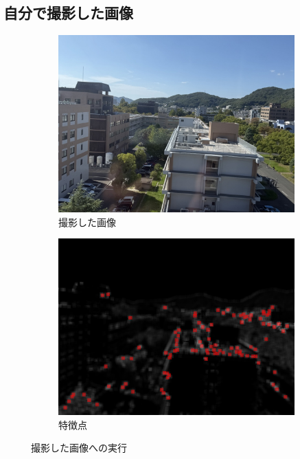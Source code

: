 \documentclass[autodetect-engine,dvi=dvipdfmx,ja=standard,
               a4j,11pt]{bxjsarticle}
\begin{document}
\subsection{自分で撮影した画像}
\begin{figure}[h]
 \centering
 \begin{subfigure}[b]{0.45\textwidth}
   \centering
   \includegraphics[scale=0.2]{IMG_5566.jpg}
   \caption{撮影した画像}
   \label{fig:5.2_TKfilter.png}
 \end{subfigure}
 \hspace{5mm}
 \begin{subfigure}[b]{0.45\textwidth}
   \centering
   \includegraphics[scale=0.2]{5.3_myfeatures.jpg}
   \caption{特徴点}
   \label{fig:5.2_LocalMax.png}
 \end{subfigure}
 \caption{撮影した画像への実行}
 \label{fig:comparison_W}
\end{figure}
\end{document}
